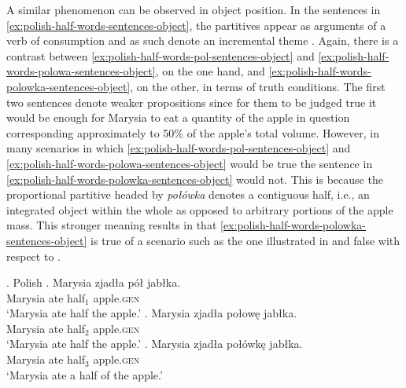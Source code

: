 A similar phenomenon can be observed in object position. In the sentences in \ref{ex:polish-half-words-sentences-object}, the partitives appear as arguments of a verb of consumption and as such denote an incremental theme \citep[see, e.g.,][]{dowty1991thematic,krifka1998origins,filip1999aspect,rothstein2003structuring}. Again, there is a contrast between \ref{ex:polish-half-words-pol-sentences-object} and \ref{ex:polish-half-words-polowa-sentences-object}, on the one hand, and \ref{ex:polish-half-words-polowka-sentences-object}, on the other, in terms of truth conditions. The first two sentences denote weaker propositions since for them to be judged true it would be enough for Marysia to eat a quantity of the apple in question corresponding approximately to 50\% of the apple's total volume. However, in many scenarios in which \ref{ex:polish-half-words-pol-sentences-object} and \ref{ex:polish-half-words-polowa-sentences-object} would be true the sentence in \ref{ex:polish-half-words-polowka-sentences-object} would not. This is because the proportional partitive headed by \textit{połówka} denotes a contiguous half, i.e., an integrated object within the whole as opposed to arbitrary portions of the apple mass. This stronger meaning results in that \ref{ex:polish-half-words-polowka-sentences-object} is true of a scenario such as the one illustrated in  and false with respect to .

\ex.\label{ex:polish-half-words-sentences-object} Polish
\ag. Marysia zjadła pół jabłka.\label{ex:polish-half-words-pol-sentences-object}\\
Marysia ate half$_1$ apple\textsc{.gen}\\
`Marysia ate half the apple.'
\bg. Marysia zjadła połowę jabłka.\label{ex:polish-half-words-polowa-sentences-object}\\
Marysia ate half$_2$ apple\textsc{.gen}\\
`Marysia ate half the apple.'
\bg. Marysia zjadła połówkę jabłka.\label{ex:polish-half-words-polowka-sentences-object}\\
Marysia ate half$_3$ apple\textsc{.gen}\\
`Marysia ate a half of the apple.'

